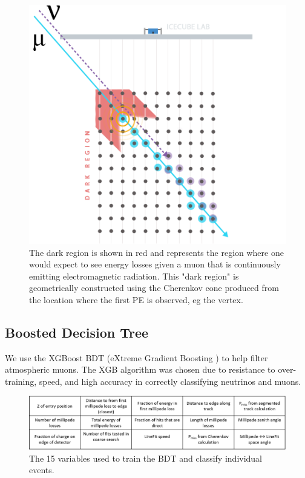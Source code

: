 \documentclass{PoS}
\begin{document}
\begin{figure}[h!]
\centering 
    \includegraphics[width=0.85\linewidth]{VetoGraphic_V2_AtmoNu.png}
    \caption{The dark region is shown in red and represents the region where one would expect to see energy losses given a muon that is continuously emitting electromagnetic radiation. This "dark region" is geometrically constructed using the Cherenkov cone produced from the location where the first PE is observed, eg the vertex. }
\label{fig:STV}
\end{figure}

\subsection{Boosted Decision Tree}\label{sec:ESTES_BDT}
We use the XGBoost BDT (eXtreme Gradient Boosting \cite{Chen:2016:XST:2939672.2939785})  to help filter atmospheric muons. The XGB algorithm was chosen due to resistance to over-training, speed, and high accuracy in correctly classifying neutrinos and muons.\\

\begin{figure}[h!]
\centering 
    \includegraphics[width=0.85\linewidth]{BDT_Variables_ESTES.png}
    \caption{The 15 variables used to train the BDT and classify individual events.}
\label{fig:BDT_variables}
\end{figure}
\end{document}
